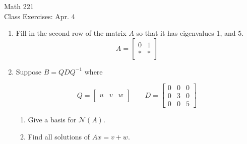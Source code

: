\documentclass[11pt]{article}
\begin{document}
\begin{center}
	\Large
	\rm{Math 221}
	\\
	\rm{Class Exercises:  Apr. 4}
	\\
\end{center}
\vspace{0.2in}

\begin{enumerate}
\item{Fill in the second row of the matrix $A$ so that it has eigenvalues 1, and 5.
	\begin{displaymath}
	A = \left[ \begin{array}{rr} 0&1 \\
	* & *  \end{array} \right]
	\end{displaymath}
	}

\vspace{0.5in}

\item{Suppose $B=QDQ^{-1}$ where

\begin{displaymath}
Q = \left[ \begin{array}{c|c|c} & &  \\ u & v & w \\ & &   \end{array} \right] \quad\quad
D = \left[ \begin{array}{ccc}  0 & 0 & 0 \\ 0 & 3 & 0 \\ 0 & 0 & 5  \end{array} \right] 
\end{displaymath}	

\begin{enumerate}
	\item {Give a basis for $\mathcal{N}(A)$.}
	\item {Find all solutions of $Ax=v+w$.}
\end{enumerate}
}

\end{enumerate}

\vspace{0.1in}
\end{document}
